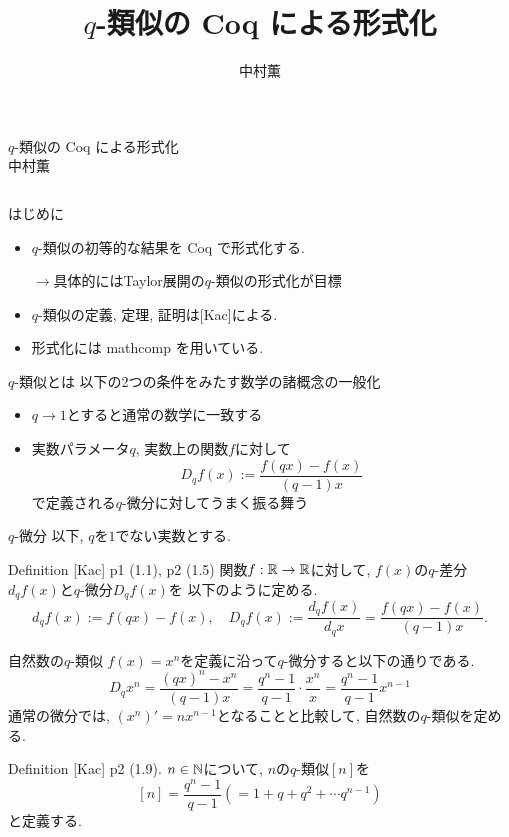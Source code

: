 \documentclass[unicode,mathserif]{beamer}
\title{$q$-類似の Coq による形式化}
\author{中村薫}
\begin{document}
\begin{frame}[fragile]
    \begin{center}
      {\Huge $q$-類似の Coq による形式化} \\
      {\Large 中村薫} 
    \end{center}

	\begin{columns}[T]
		\begin{column}{0.33\columnwidth}
			\begin{block}{はじめに}
				\begin{itemize}
				\item $q$-類似の初等的な結果を Coq で形式化する. 
				
					$\to$具体的にはTaylor展開の$q$-類似の形式化が目標 
				\item $q$-類似の定義, 定理, 証明は[Kac]による. 
				\item 形式化には mathcomp を用いている. 
				\end{itemize}
			\end{block}
			
		\begin{block}{$q$-類似とは}
			以下の2つの条件をみたす数学の諸概念の一般化
			\begin{itemize}
				\item $q \to 1$とすると通常の数学に一致する
	          \item 実数パラメータ$q$, 実数上の関数$f$に対して
					\[
						D_q f(x) := \frac{f(qx) - f(x)}{(q - 1) x}
					\]
					で定義される$q$-微分に対してうまく振る舞う
			\end{itemize}
		\end{block}

		\begin{block}{$q$-微分}
			以下, $q$を$1$でない実数とする.
			\begin{itembox}{Definition [Kac] p1 (1.1), p2 (1.5)}
				関数$f : \mathbb R \to \mathbb R$に対して, $f(x)$の$q$-差分$d_q f(x)$と$q$-微分$D_q f(x)$を
				以下のように定める.  
				\[
					d_q f(x) := f (qx) - f(x), \quad
					D_q f(x) := \frac{d_q f(x)}{d_q x} = \frac{f(qx) - f(x)}{(q - 1) x}.
				\]
			\end{itembox}
		\end{block}
   
		\begin{block}{自然数の$q$-類似}
			$f(x) = x^n$を定義に沿って$q$-微分すると以下の通りである. 
			\[
				D_q x^n = \frac{(qx)^n - x^n}{(q - 1) x}
								= \frac{q^n - 1}{q - 1} \cdot \frac{x^n}{x}
								= \frac{q^n - 1}{q - 1} x^{n - 1}
			\]
			通常の微分では, $(x^n)' = n x^{n - 1}$となることと比較して, 
			自然数の$q$-類似を定める.
			\begin{itembox}{Definition [Kac] p2 (1.9)}.
				$n \in \mathbb N$について, $n$の$q$-類似$[n]$を
				\[
					[n] = \frac{q^n - 1}{q - 1} (= 1 + q + q^2 + \cdots q^{n - 1})
				\]
				と定義する. 
			\end{itembox}
		\end{block}


\end{column}
\end{columns}
\end{frame}
\end{document}
